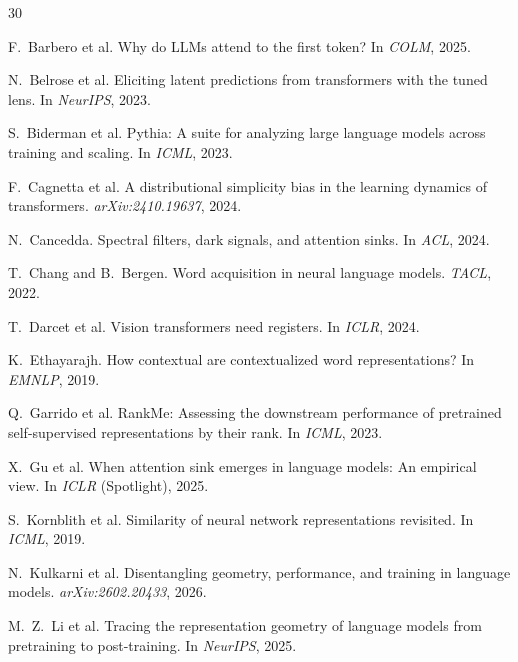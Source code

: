 \documentclass[11pt]{article}
\begin{document}

\begin{thebibliography}{30}

F.~Barbero et al. Why do LLMs attend to the first token? In \emph{COLM}, 2025.

N.~Belrose et al. Eliciting latent predictions from transformers with the tuned lens. In \emph{NeurIPS}, 2023.

S.~Biderman et al. Pythia: A suite for analyzing large language models across training and scaling. In \emph{ICML}, 2023.

F.~Cagnetta et al. A distributional simplicity bias in the learning dynamics of transformers. \emph{arXiv:2410.19637}, 2024.

N.~Cancedda. Spectral filters, dark signals, and attention sinks. In \emph{ACL}, 2024.

T.~Chang and B.~Bergen. Word acquisition in neural language models. \emph{TACL}, 2022.

T.~Darcet et al. Vision transformers need registers. In \emph{ICLR}, 2024.

K.~Ethayarajh. How contextual are contextualized word representations? In \emph{EMNLP}, 2019.

Q.~Garrido et al. RankMe: Assessing the downstream performance of pretrained self-supervised representations by their rank. In \emph{ICML}, 2023.

X.~Gu et al. When attention sink emerges in language models: An empirical view. In \emph{ICLR} (Spotlight), 2025.

S.~Kornblith et al. Similarity of neural network representations revisited. In \emph{ICML}, 2019.

N.~Kulkarni et al. Disentangling geometry, performance, and training in language models. \emph{arXiv:2602.20433}, 2026.

M.~Z.~Li et al. Tracing the representation geometry of language models from pretraining to post-training. In \emph{NeurIPS}, 2025.


\end{thebibliography}
\end{document}
